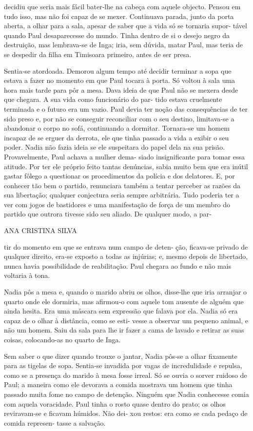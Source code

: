 decidiu que seria mais fácil bater‑lhe na cabeça com aquele objecto.
Pensou em tudo isso, mas não foi capaz de se mexer. Continuava parada,
junto da porta aberta, a olhar para a sala, apesar de saber que a vida
só se tornaria supor‑ tável quando Paul desaparecesse do mundo. Tinha
dentro de si o desejo negro da destruição, mas lembrava‑se de Inga;
iria, sem dúvida, matar Paul, mas teria de se despedir da filha em
Timisoara primeiro, antes de ser presa.

Sentia‑se atordoada. Demorou algum tempo até decidir terminar a sopa que
estava a fazer no momento em que Paul tocara à porta. Só voltou à sala
uma hora mais tarde para pôr a mesa. Dava ideia de que Paul não se
mexera desde que chegara. A sua vida como funcionário do par‑ tido
estava cruelmente terminada e o futuro era um vazio. Paul devia ter
noção das consequências de ter sido preso e, por não se conseguir
reconciliar com o seu destino, limitava‑se a abandonar o corpo no sofá,
continuando a dormitar. Tornara‑se um homem incapaz de se erguer da
derrota, ele que tinha passado a vida a exibir o seu poder. Nadia não
fazia ideia se ele suspeitara do papel dela na sua prisão.
Provavelmente, Paul achava a mulher dema‑ siado insignificante para
tomar essa atitude. Por ter ele próprio feito tantas denúncias, sabia
muito bem que era inútil gastar fôlego a questionar os procedimentos da
polícia e dos delatores. E, por conhecer tão bem o partido, renunciara
também a tentar perceber as razões da sua libertação; qualquer
conjectura seria sempre arbitrária. Tudo poderia ter a ver com jogos de
bastidores e uma manifestação de força de um membro do partido que
outrora tivesse sido seu aliado. De qualquer modo, a par‑

ANA CRISTINA SILVA

tir do momento em que se entrava num campo de deten‑ ção, ficava‑se
privado de qualquer direito, era‑se exposto a todas as injúrias; e,
mesmo depois de libertado, nunca havia possibilidade de reabilitação.
Paul chegara ao fundo e não mais voltaria à tona.

Nadia pôs a mesa e, quando o marido abriu os olhos, disse‑lhe que iria
arranjar o quarto onde ele dormiria, mas afirmou‑o com aquele tom
ausente de alguém que ainda hesita. Era uma máscara sem expressão que
falava por ela. Nadia só era capaz de o olhar à distância, como se esti‑
vesse a observar um pequeno animal, e não um homem. Saiu da sala para
lhe ir fazer a cama de lavado e retirar as suas coisas, colocando‑as no
quarto de Inga.

Sem saber o que dizer quando trouxe o jantar, Nadia pôs‑se a olhar
fixamente para as tigelas de sopa. Sentia‑se invadida por vagas de
incredulidade e repulsa, como se a presença do marido à mesa fosse
irreal. Só se ouvia o sorver ruidoso de Paul; a maneira como ele
devorava a comida mostrava um homem que tinha passado muita fome no
campo de detenção. Ninguém que Nadia conhecesse comia com aquela
voracidade. Paul tinha o rosto quase dentro do prato; os olhos
reviravam‑se e ficavam húmidos. Não dei‑ xou restos: era como se cada
pedaço de comida represen‑ tasse a salvação.

